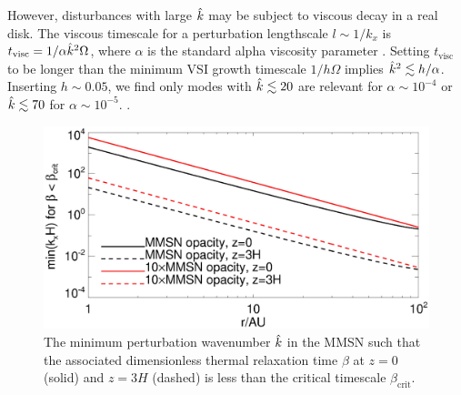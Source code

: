 
However, disturbances with large $\hat{k}$ may be subject to viscous
decay in a real disk. The viscous timescale for a perturbation lengthscale 
$l\sim 1/k_x$ is $t_\mathrm{visc} = 1/\alpha\hat{k}^2\Omega $, where
$\alpha$ is the standard alpha viscosity parameter
\citep{shakura73}. Setting $t_\mathrm{visc}$ to be longer than the
minimum VSI growth timescale $1/h\Omega$ implies 
$\hat{k}^2\lesssim h/\alpha$. Inserting $h \sim 0.05$,
we find only modes with $\hat{k}\lesssim 20$ are relevant for
$\alpha\sim 10^{-4}$ or $\hat{k}\lesssim 70$ for $\alpha\sim
10^{-5}$. .


\begin{figure}
  \includegraphics[width=\linewidth]{figures/bcrit_mink} 
  \caption{The minimum perturbation wavenumber $\hat{k}$ in
    the MMSN such that the associated dimensionless thermal
    relaxation time $\beta$ at $z=0$ (solid) and $z=3H$ (dashed) is
    less than the critical timescale $\beta_\mathrm{crit}$.   
    \label{mmsn_bcrit_bcool_mink}}   
\end{figure}  

